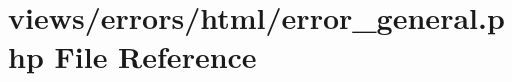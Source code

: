 \hypertarget{html_2error__general_8php}{}\section{views/errors/html/error\+\_\+general.php File Reference}
\label{html_2error__general_8php}
